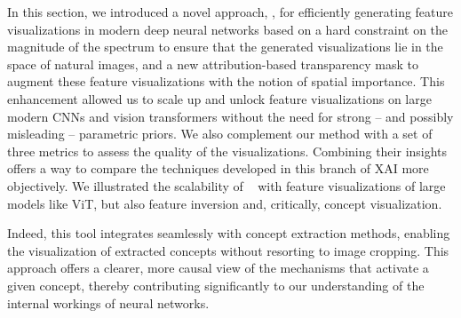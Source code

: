 In this section, we introduced a novel approach, \magfv, for efficiently generating feature visualizations in modern deep neural networks based on  a hard constraint on the magnitude of the spectrum to ensure that the generated visualizations lie in the space of natural images, and  a new attribution-based transparency mask to augment these feature visualizations with the notion of spatial importance. This enhancement allowed us to scale up and unlock feature visualizations on large modern CNNs and vision transformers without the need for strong -- and possibly misleading -- parametric priors.
We also complement our method with a set of three metrics to assess the quality of the visualizations. Combining their insights offers a way to compare the techniques developed in this branch of XAI more objectively. We illustrated the scalability of \magfv~ with feature visualizations of large models like ViT, but also feature inversion and, critically, concept visualization.

Indeed, this tool integrates seamlessly with concept extraction methods, enabling the visualization of extracted concepts without resorting to image cropping. This approach offers a clearer, more causal view of the mechanisms that activate a given concept, thereby contributing significantly to our understanding of the internal workings of neural networks.

